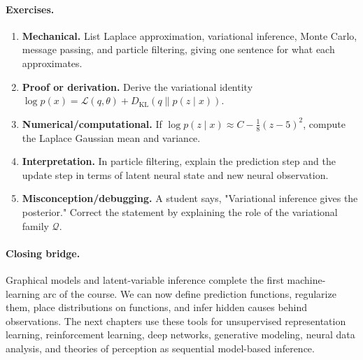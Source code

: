 \paragraph{Exercises.}
\begin{enumerate}[label=\textbf{34.4.\arabic*.}, leftmargin=*]
\item \textbf{Mechanical.} List Laplace approximation, variational inference, Monte Carlo, message passing, and particle filtering, giving one sentence for what each approximates.
\item \textbf{Proof or derivation.} Derive the variational identity \(\log p(x)=\mathcal L(q,\theta)+D_{\mathrm{KL}}(q\|p(z\mid x))\).
\item \textbf{Numerical/computational.} If \(\log p(z\mid x)\approx C-\frac{1}{8}(z-5)^2\), compute the Laplace Gaussian mean and variance.
\item \textbf{Interpretation.} In particle filtering, explain the prediction step and the update step in terms of latent neural state and new neural observation.
\item \textbf{Misconception/debugging.} A student says, "Variational inference gives the posterior." Correct the statement by explaining the role of the variational family \(\mathcal Q\).
\end{enumerate}

\paragraph{Closing bridge.}
Graphical models and latent-variable inference complete the first machine-learning arc of the course. We can now define prediction functions, regularize them, place distributions on functions, and infer hidden causes behind observations. The next chapters use these tools for unsupervised representation learning, reinforcement learning, deep networks, generative modeling, neural data analysis, and theories of perception as sequential model-based inference.

\clearpage
